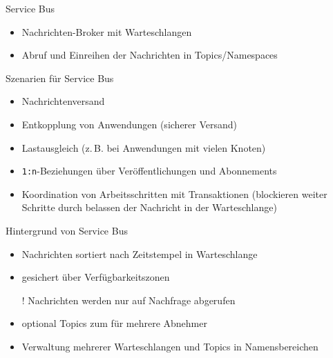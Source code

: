\begin{flashcard}[]{Service Bus}
  \begin{itemize}
    \item Nachrichten-Broker mit Warteschlangen
    \item Abruf und Einreihen der Nachrichten in Topics/Namespaces
  \end{itemize}
\end{flashcard}

\begin{flashcard}[]{Szenarien für Service Bus}
  \begin{itemize}
    \item Nachrichtenversand
    \item Entkopplung von Anwendungen (sicherer Versand)
    \item Lastausgleich (z.\,B. bei Anwendungen mit vielen Knoten)
    \item \texttt{1:n}-Beziehungen über Veröffentlichungen und Abonnements
    \item Koordination von Arbeitsschritten mit Transaktionen\newline
      (blockieren weiter Schritte durch belassen der Nachricht in der Warteschlange)
  \end{itemize}
\end{flashcard}

\begin{flashcard}[]{Hintergrund von Service Bus}
  \begin{itemize}
    \item Nachrichten sortiert nach Zeitstempel in Warteschlange
    \item gesichert über Verfügbarkeitszonen
    \item[!] Nachrichten werden nur auf Nachfrage abgerufen
    \item optional Topics zum für mehrere Abnehmer
    \item Verwaltung mehrerer Warteschlangen und Topics in Namensbereichen
  \end{itemize}
\end{flashcard}


